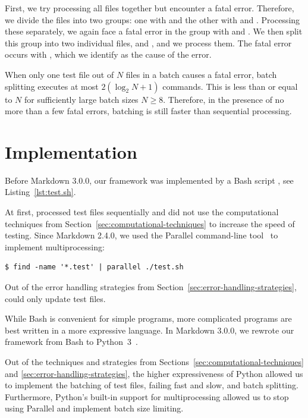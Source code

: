 \documentclass[final]{ltugboat}
\begin{document}
\medskip
\noindent
First, we try processing all files together but encounter a fatal error. Therefore, we divide the files into two groups: one with  and the other with  and . Processing these separately, we again face a fatal error in the group with  and . We then split this group into two individual files,  and , and we process them. The fatal error occurs with , which we identify as the cause of the error.

When only one test file out of $N$ files in a batch causes a fatal error, batch splitting executes at most $2 (\log_2 N + 1)$ commands. This is less than or equal to $N$ for sufficiently large batch sizes $N\geq 8$. Therefore, in the presence of no more than a few fatal errors, batching is still faster than sequential processing.

\smallskip
\noindent
\begingroup
\centering

\par
\endgroup

\section{Implementation}
\label{sec:implementation}

Before Markdown 3.0.0, our framework was implemented by a Bash script , see Listing~\ref{lst:test.sh}.

At first,  processed test files sequentially and did not use the computational techniques from Section~\ref{sec:computational-techniques} to increase the speed of testing. Since Markdown 2.4.0, we used the  Parallel command-line tool~\cite{tange2011gnu} to implement multiprocessing:
\begin{verbatim}
$ find -name '*.test' | parallel ./test.sh
\end{verbatim}
Out of the error handling strategies from Section~\ref{sec:error-handling-strategies},  could only update test files.

While Bash is convenient for simple programs, more complicated programs are best written in a more expressive language. In Markdown 3.0.0, we rewrote our framework from Bash to Python~3~\cite{novotny2023implement}.

Out of the techniques and strategies from Sections~\ref{sec:computational-techniques} and \ref{sec:error-handling-strategies}, the higher expressiveness of Python allowed us to implement the batching of test files, failing fast and slow, and batch splitting. Furthermore, Python's built-in support for multiprocessing allowed us to stop using  Parallel and implement batch size limiting.
\end{document}
